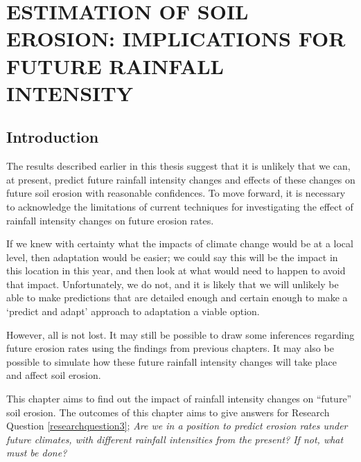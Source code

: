 \chapter{ESTIMATION OF SOIL EROSION: IMPLICATIONS FOR FUTURE RAINFALL
INTENSITY}
\label{sec:ESTIMATIONSOFFUTURESOILEROSION}

\section{Introduction}
\label{sec:FutureSoilErosionIntroduction}

The results described earlier in this thesis suggest that it is unlikely that
we can, at present, predict future rainfall intensity changes and effects of
these changes on future soil erosion with reasonable confidences. To move
forward, it is necessary to acknowledge the limitations of current techniques
for investigating the effect of rainfall intensity changes on future erosion
rates.

If we knew with certainty what the impacts of climate change would be at a local
level, then adaptation would be easier; we could say this will be the impact in
this location in this year, and then look at what would need to happen to avoid
that impact. Unfortunately, we do not, and it is likely that we will unlikely be
able to make predictions that are detailed enough and certain enough to make a
`predict and adapt' approach to adaptation a viable option.

However, all is not lost. It may still be possible to draw some
inferences regarding future erosion rates using
the findings from previous chapters. It may also be possible to simulate how
these future rainfall intensity changes will take place and affect soil
erosion.

This chapter aims to find out the impact of rainfall intensity changes on
``future'' soil erosion. The outcomes of this chapter aims to give answers for
Research Question \ref{researchquestion3}; \textit{Are we in a position to
predict erosion rates under future climates, with different rainfall intensities
from the present? If not, what must be done?}


